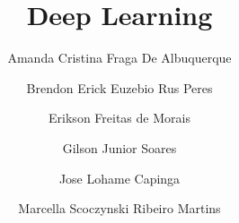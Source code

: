 \title{Deep Learning}
\label{chp:deep-learning}
\author{Amanda Cristina Fraga De Albuquerque \and
        Brendon Erick Euzebio Rus Peres \and
        Erikson Freitas de Morais \and
        Gilson Junior Soares \and
        Jose Lohame Capinga \and
        Marcella Scoczynski Ribeiro Martins}

%

\maketitle









